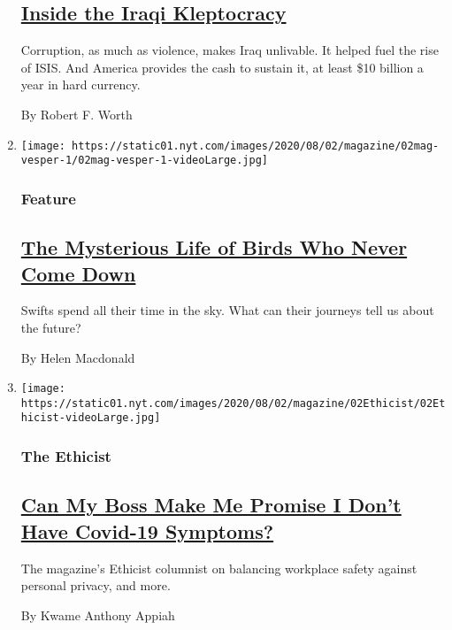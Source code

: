 \begin{enumerate}
  \hypertarget{inside-the-iraqi-kleptocracy}{%
  \subsection{\texorpdfstring{\href{/2020/07/29/magazine/iraq-corruption.html}{Inside
  the Iraqi
  Kleptocracy}}{Inside the Iraqi Kleptocracy}}\label{inside-the-iraqi-kleptocracy}}

  Corruption, as much as violence, makes Iraq unlivable. It helped fuel
  the rise of ISIS. And America provides the cash to sustain it, at
  least \$10 billion a year in hard currency.

  By Robert F. Worth
\item
  \texttt{[image: https://static01.nyt.com/images/2020/08/02/magazine/02mag-vesper-1/02mag-vesper-1-videoLarge.jpg]}

  \hypertarget{feature-2}{%
  \subsubsection{Feature}\label{feature-2}}

  \hypertarget{the-mysterious-life-of-birds-who-never-come-down}{%
  \subsection{\texorpdfstring{\href{/2020/07/29/magazine/vesper-flights.html}{The
  Mysterious Life of Birds Who Never Come
  Down}}{The Mysterious Life of Birds Who Never Come Down}}\label{the-mysterious-life-of-birds-who-never-come-down}}

  Swifts spend all their time in the sky. What can their journeys tell
  us about the future?

  By Helen Macdonald
\item
  \texttt{[image: https://static01.nyt.com/images/2020/08/02/magazine/02Ethicist/02Ethicist-videoLarge.jpg]}

  \hypertarget{the-ethicist}{%
  \subsubsection{The Ethicist}\label{the-ethicist}}

  \hypertarget{can-my-boss-make-me-promise-i-dont-have-covid-19-symptoms}{%
  \subsection{\texorpdfstring{\href{/2020/07/28/magazine/can-my-boss-make-me-promise-i-dont-have-covid-19-symptoms.html}{Can
  My Boss Make Me Promise I Don't Have Covid-19
  Symptoms?}}{Can My Boss Make Me Promise I Don't Have Covid-19 Symptoms?}}\label{can-my-boss-make-me-promise-i-dont-have-covid-19-symptoms}}

  The magazine's Ethicist columnist on balancing workplace safety
  against personal privacy, and more.

  By Kwame Anthony Appiah
\end{enumerate}

